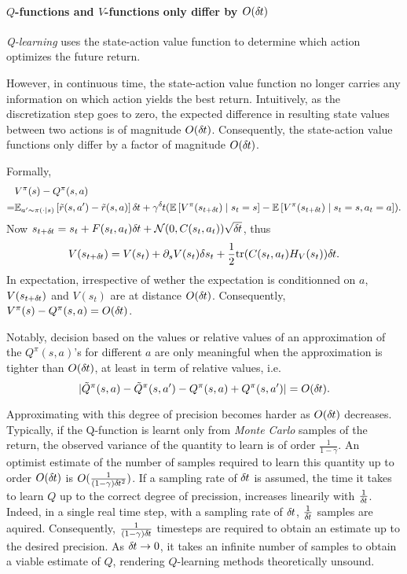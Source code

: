 
\paragraph{$Q$-functions and $V$-functions only differ by $O (\delta\hspace{-.06em}t)$}
\label{sec:QContinuous}
\emph{Q-learning} uses the state-action value function to determine which
action optimizes the future return.

However, in continuous time, the state-action value function no longer carries
any information on which action yields the best return. Intuitively, as the
discretization step goes to zero, the expected difference in resulting state
values between two actions is of magnitude $O (\delta\hspace{-.06em}t)$. Consequently, the
state-action value functions only differ by a factor of magnitude
$O (\delta\hspace{-.06em}t)$.

Formally,
\begin{align}
	&V^\pi(s) - Q^\pi(s, a)\\ 
	= &\BE_{a'\sim \pi(\cdot\mid s)}
	\left[\tilde{r}(s, a') - \tilde{r}(s, a)\right] \deltat
	+
	\gamma^\deltat 
	(\BE\left[V^\pi(s_{t+\deltat}) \mid s_t=s\right]
	-
	\BE\left[V^\pi(s_{t+\deltat}) \mid s_t=s, a_t=a\right]).\nonumber
\end{align}
Now $s_{t + \delta\hspace{-.06em}t} = s_t + F(s_t, a_t) \delta\hspace{-.06em}t +
\mathcal{N}(0, C(s_t, a_t)) \sqrt{\delta\hspace{-.06em}t}$, thus 
\begin{equation}
	V(s_{t+\delta\hspace{-.06em}t}) = V(s_t) + \partial_s V(s_t) \delta s_t
	+ \frac{1}{2}\mathrm{tr}(C(s_t, a_t) H_V(s_t))\delta\hspace{-.06em}t.
\end{equation}
In expectation, irrespective of wether the expectation is conditionned on $a$,
$V(s_{t+\delta\hspace{-.06em}t})$ and $V(s_t)$ are at distance $O (\delta\hspace{-.06em}t)$. Consequently,
$V^\pi(s) - Q^\pi(s, a) = O (\delta\hspace{-.06em}t)$.

Notably, decision based on the values or relative values of an approximation of
the $Q^\pi(s, a)$'s for different $a$ are only meaningful when the
approximation is tighter than $O (\delta\hspace{-.06em}t)$, at least in term of relative
values, i.e.  
\begin{equation*}
	|\tilde{Q}^\pi(s, a) - \tilde{Q}^\pi(s, a') - Q^\pi(s, a) +
	Q^\pi(s, a')| = O (\delta\hspace{-.06em}t).
\end{equation*}

Approximating with this degree of precision becomes harder as $O (\delta\hspace{-.06em}t)$
decreases. Typically, if the Q-function is learnt only from \emph{Monte Carlo} samples
of the return, the observed variance of the quantity to learn is of order
$\frac{1}{1 - \gamma}$. An optimist estimate of the number of
samples required to learn this quantity up to order $O (\delta\hspace{-.06em}t)$ is 
$O (\frac{1}{(1 - \gamma) \delta\hspace{-.06em}t^2})$. If a sampling rate of $\delta\hspace{-.06em}t$ is
assumed, the time it takes to learn $Q$ up to the correct degree of precission,
increases linearily with $\frac{1}{\delta\hspace{-.06em}t}$. Indeed, in a single real time step, with a
sampling rate of $\delta\hspace{-.06em}t$, $\frac{1}{\delta\hspace{-.06em}t}$ samples are aquired. Consequently,
$\frac{1}{(1 - \gamma) \delta\hspace{-.06em}t}$ timesteps are required to obtain an estimate up
to the desired precision. As $\delta\hspace{-.06em}t \to 0$, it takes an infinite number of samples
to obtain a viable estimate of $Q$, rendering $Q$-learning methods theoretically
unsound.

